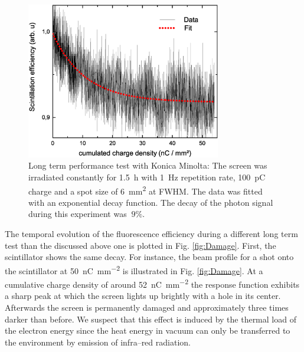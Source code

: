\documentclass[%
reprint,
amsmath,
amssymb,
aip,
rsi, 
numerical,
floatfix,
]{revtex4-1}
\begin{document}
\begin{figure}
\includegraphics[width=8.5cm]{./Figures/Dt_Min_rel}%
\caption{\label{fig:Dt_Min_rel} Long term performance test with Konica Minolta: 
The screen was irradiated constantly for \SI{1.5}{\hour} with \SI{1}{\hertz} repetition rate, \SI{100}{\pico\coulomb} charge and a spot size of \SI{6}{\square\milli\meter} at FWHM. 
The data was fitted with an exponential decay function. 
The decay of the photon signal during this experiment was $~9\%$.}
\end{figure}

The temporal evolution of the fluorescence efficiency during a different long term test than the discussed above one is plotted in Fig. \ref{fig:Damage}.
First, the scintillator shows the same decay. 
For instance, the beam profile for a shot onto the scintillator at \SI[per-mode=symbol]{50}{\nano \coulomb \per \square \milli \meter} is illustrated in Fig. \ref{fig:Damage}.
At a cumulative charge density of around \SI[per-mode=symbol]{52}{\nano \coulomb \per \square \milli \meter} the response function exhibits a sharp peak at which the screen lights up brightly with a hole in its center.
Afterwards the screen is permanently damaged and approximately three times darker than before.
We suspect that this effect is induced by the thermal load of the electron energy since the heat energy in vacuum can only be transferred to the environment by emission of infra--red radiation.
\end{document}
